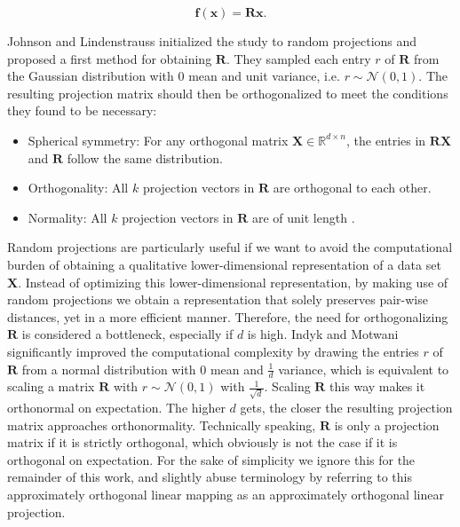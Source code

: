 \vspace{0.1cm}
\begin{equation}
	\mathbf{f}(\mathbf{x}) = \mathbf{R}\mathbf{x}.
\end{equation}

Johnson and Lindenstrauss initialized the study to random projections and proposed a first method for obtaining $\mathbf{R}$. They sampled each entry $r$ of $\mathbf{R}$ from the Gaussian distribution with $0$ mean and unit variance, i.e. $r \sim \mathcal{N}(0,1)$. The resulting projection matrix should then be orthogonalized to meet the conditions they found to be necessary:

\begin{itemize}
	\item Spherical symmetry: For any orthogonal matrix $\mathbf{X} \in \mathbb{R}^{d \times n}$, the entries in $\mathbf{R} \mathbf{X}$ and $\mathbf{R}$ follow the same distribution.
	\item Orthogonality: All $k$ projection vectors in $\mathbf{R}$ are orthogonal to each other.
	\item Normality: All $k$ projection vectors in $\mathbf{R}$ are of unit length \cite{ailon2009fast}.
\end{itemize}

Random projections are particularly useful if we want to avoid the computational burden of obtaining a qualitative lower-dimensional representation of a data set $\mathbf{X}$. Instead of optimizing this lower-dimensional representation, by making use of random projections we obtain a representation that solely preserves pair-wise distances, yet in a more efficient manner. Therefore, the need for orthogonalizing $\mathbf{R}$ is considered a bottleneck, especially if $d$ is high. Indyk and Motwani \cite{indyk1998approximate} significantly improved the computational complexity by drawing the entries $r$ of $\mathbf{R}$ from a normal distribution with $0$ mean and $\frac{1}{d}$ variance, which is equivalent to scaling a matrix $\mathbf{R}$ with $r \sim \mathcal{N}(0,1)$ with $\frac{1}{\sqrt{d}}$. Scaling $\mathbf{R}$ this way makes it orthonormal on expectation. The higher $d$ gets, the closer the resulting projection matrix approaches orthonormality. Technically speaking, $\mathbf{R}$ is only a projection matrix if it is strictly orthogonal, which obviously is not the case if it is orthogonal on expectation. For the sake of simplicity we ignore this for the remainder of this work, and slightly abuse terminology by referring to this approximately orthogonal linear mapping as an approximately orthogonal linear projection.

